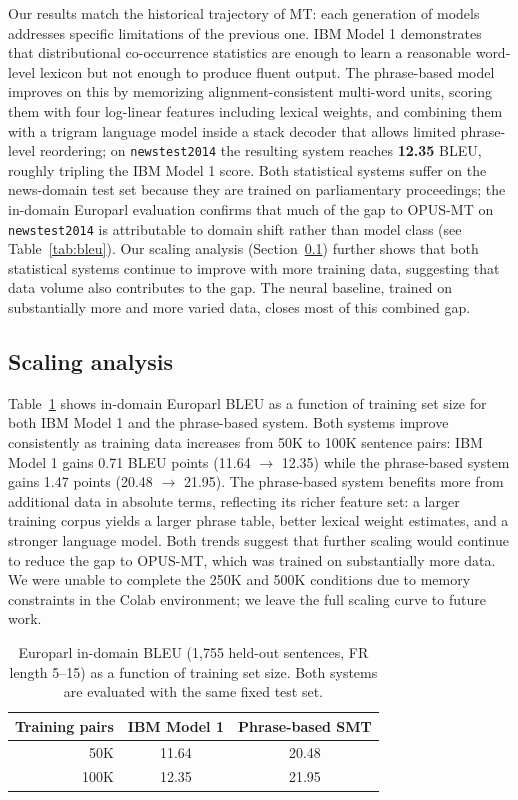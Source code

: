 \documentclass[11pt]{article}
\begin{document}
Our results match the historical trajectory of MT: each generation of models addresses specific limitations of the previous one. IBM Model 1 demonstrates that distributional co-occurrence statistics are enough to learn a reasonable word-level lexicon but not enough to produce fluent output. The phrase-based model improves on this by memorizing alignment-consistent multi-word units, scoring them with four log-linear features including lexical weights, and combining them with a trigram language model inside a stack decoder that allows limited phrase-level reordering; on \texttt{newstest2014} the resulting system reaches \textbf{12.35} BLEU, roughly tripling the IBM Model 1 score. Both statistical systems suffer on the news-domain test set because they are trained on parliamentary proceedings; the in-domain Europarl evaluation confirms that much of the gap to OPUS-MT on \texttt{newstest2014} is attributable to domain shift rather than model class (see Table~\ref{tab:bleu}). Our scaling analysis (Section~\ref{sec:scaling}) further shows that both statistical systems continue to improve with more training data, suggesting that data volume also contributes to the gap. The neural baseline, trained on substantially more and more varied data, closes most of this combined gap.
 
\subsection{Scaling analysis}
\label{sec:scaling}

Table~\ref{tab:scaling} shows in-domain Europarl BLEU as a function of training set size for both IBM Model 1 and the phrase-based system. Both systems improve consistently as training data increases from 50K to 100K sentence pairs: IBM Model 1 gains 0.71 BLEU points (11.64 $\rightarrow$ 12.35) while the phrase-based system gains 1.47 points (20.48 $\rightarrow$ 21.95). The phrase-based system benefits more from additional data in absolute terms, reflecting its richer feature set: a larger training corpus yields a larger phrase table, better lexical weight estimates, and a stronger language model. Both trends suggest that further scaling would continue to reduce the gap to OPUS-MT, which was trained on substantially more data. We were unable to complete the 250K and 500K conditions due to memory constraints in the Colab environment; we leave the full scaling curve to future work.

\begin{table}[t]
\centering
\small
\begin{tabular}{rcc}
\toprule
\textbf{Training pairs} & \textbf{IBM Model 1} & \textbf{Phrase-based SMT} \\
\midrule
50K  & 11.64 & 20.48 \\
100K & 12.35 & 21.95 \\
\bottomrule
\end{tabular}
\caption{Europarl in-domain BLEU (1{,}755 held-out sentences, FR length 5--15) as a function of training set size. Both systems are evaluated with the same fixed test set.}
\label{tab:scaling}
\end{table}
\end{document}
